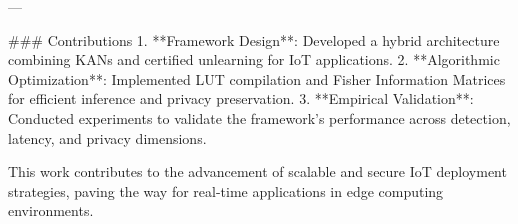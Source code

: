 ---

### Contributions  
1. **Framework Design**: Developed a hybrid architecture combining KANs and certified unlearning for IoT applications.  
2. **Algorithmic Optimization**: Implemented LUT compilation and Fisher Information Matrices for efficient inference and privacy preservation.  
3. **Empirical Validation**: Conducted experiments to validate the framework's performance across detection, latency, and privacy dimensions.

This work contributes to the advancement of scalable and secure IoT deployment strategies, paving the way for real-time applications in edge computing environments.